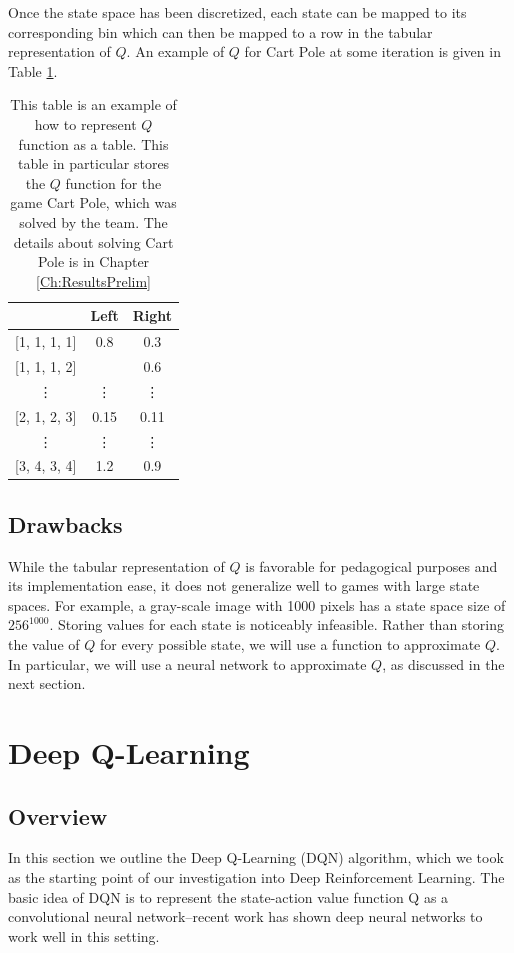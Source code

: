 Once the state space has been discretized, each state can be mapped to its
corresponding bin which can then be mapped to a row in the tabular representation
of $Q$. An example of $Q$ for Cart Pole at some iteration is given in 
Table \ref{table: tab_q_ex}.

\begin{table}[h!]
\centering
\begin{tabular}{ c|c|c } 
  & Left & Right \\
 \hline
 {[1, 1, 1, 1]} & 0.8 & 0.3 \\
 {[1, 1, 1, 2]} &  & 0.6 \\
 \vdots & \vdots & \vdots \\
 {[2, 1, 2, 3]} & 0.15 & 0.11 \\
 \vdots & \vdots & \vdots \\
 {[3, 4, 3, 4]} & 1.2 & 0.9 \\
\end{tabular}
\caption[Tabular $Q$ example]{This table is an example of how to represent $Q$ function as a table. This table in particular stores the $Q$ function for the game Cart Pole, which was solved by the team. The details about solving Cart Pole is in Chapter \ref{Ch:ResultsPrelim}}
\label{table: tab_q_ex}
\end{table}

\subsection{Drawbacks}
While the tabular representation of $Q$ is favorable for pedagogical purposes and 
its implementation ease, it does not generalize well to games with large state 
spaces. For example, a gray-scale image with 1000 pixels has a state space size 
of $256^{1000}$. Storing values for each state is noticeably infeasible. Rather 
than storing the value of $Q$ for every possible state, we will use a function
to approximate $Q$. In particular, we will use a neural network to approximate
$Q$, as discussed in the next section.

\section{Deep Q-Learning}\label{deepQ}
\subsection{Overview}
In this section we outline the Deep Q-Learning (DQN) algorithm, which we took as the starting point 
of our investigation into Deep Reinforcement Learning. The basic idea of DQN is to represent the 
state-action value function Q as a convolutional neural network--recent work has shown deep neural networks to work
well in this setting. 

